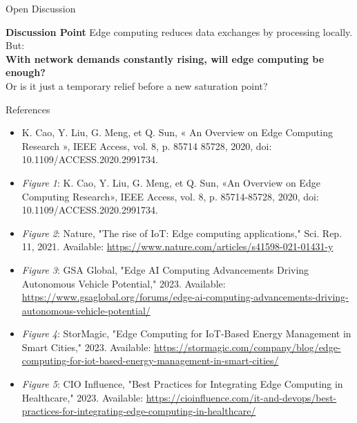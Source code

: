 \documentclass{beamer}
\begin{document}
\begin{frame}{Open Discussion}
  \begin{block}{\textbf{Discussion Point}}
    Edge computing reduces data exchanges by processing locally. But:\\
    \textbf{With network demands constantly rising, will edge computing be enough?}\\
    Or is it just a temporary relief before a new saturation point?
  \end{block}
\end{frame}

\begin{frame}{References}
    \footnotesize
    \begin{itemize}
        \item K. Cao, Y. Liu, G. Meng, et Q. Sun, « An Overview on Edge Computing Research », IEEE Access, vol. 8, p. 85714 85728, 2020, doi: 10.1109/ACCESS.2020.2991734.
        \item \textit{Figure 1}: K. Cao, Y. Liu, G. Meng, et Q. Sun, «An Overview on Edge Computing Research», IEEE Access, vol. 8, p. 85714-85728, 2020, doi: 10.1109/ACCESS.2020.2991734.
        \item \textit{Figure 2}: Nature, "The rise of IoT: Edge computing applications," Sci. Rep. 11, 2021. Available: \url{https://www.nature.com/articles/s41598-021-01431-y}
        \item \textit{Figure 3}: GSA Global, "Edge AI Computing Advancements Driving Autonomous Vehicle Potential," 2023. Available: \url{https://www.gsaglobal.org/forums/edge-ai-computing-advancements-driving-autonomous-vehicle-potential/}
        \item \textit{Figure 4}: StorMagic, "Edge Computing for IoT-Based Energy Management in Smart Cities," 2023. Available: \url{https://stormagic.com/company/blog/edge-computing-for-iot-based-energy-management-in-smart-cities/}
        \item \textit{Figure 5}: CIO Influence, "Best Practices for Integrating Edge Computing in Healthcare," 2023. Available: \url{https://cioinfluence.com/it-and-devops/best-practices-for-integrating-edge-computing-in-healthcare/}
    \end{itemize}
\end{frame}
\end{document}
